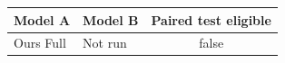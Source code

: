 \begin{tabular}{llc}
\toprule
Model A & Model B & Paired test eligible \\ 
\midrule
Ours Full & Not run & false \\
\bottomrule
\end{tabular}
